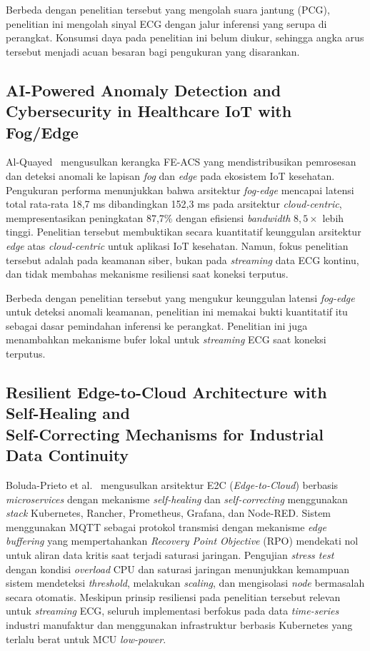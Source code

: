 Berbeda dengan penelitian tersebut yang mengolah suara jantung (PCG), penelitian ini mengolah sinyal ECG dengan jalur inferensi yang serupa di perangkat. Konsumsi daya pada penelitian ini belum diukur, sehingga angka arus tersebut menjadi acuan besaran bagi pengukuran yang disarankan.

\subsection{AI-Powered Anomaly Detection and Cybersecurity in Healthcare IoT with Fog/Edge}

Al-Quayed~\cite{al_quayed_2026} mengusulkan kerangka FE-ACS yang mendistribusikan pemrosesan dan deteksi anomali ke lapisan \textit{fog} dan \textit{edge} pada ekosistem IoT kesehatan. Pengukuran performa menunjukkan bahwa arsitektur \textit{fog-edge} mencapai latensi total rata-rata 18,7 ms dibandingkan 152,3 ms pada arsitektur \textit{cloud-centric}, mempresentasikan peningkatan 87,7\% dengan efisiensi \textit{bandwidth} $8{,}5\times$ lebih tinggi. Penelitian tersebut membuktikan secara kuantitatif keunggulan arsitektur \textit{edge} atas \textit{cloud-centric} untuk aplikasi IoT kesehatan. Namun, fokus penelitian tersebut adalah pada keamanan siber, bukan pada \textit{streaming} data ECG kontinu, dan tidak membahas mekanisme resiliensi saat koneksi terputus.

Berbeda dengan penelitian tersebut yang mengukur keunggulan latensi \textit{fog-edge} untuk deteksi anomali keamanan, penelitian ini memakai bukti kuantitatif itu sebagai dasar pemindahan inferensi ke perangkat. Penelitian ini juga menambahkan mekanisme bufer lokal untuk \textit{streaming} ECG saat koneksi terputus.

\subsection[Resilient Edge-to-Cloud Architecture with Self-Healing and Self-Correcting Mechanisms for Industrial Data Continuity]{Resilient Edge-to-Cloud Architecture with Self-Healing and\\ Self-Correcting Mechanisms for Industrial Data Continuity}

Boluda-Prieto et al.~\cite{resilient_edge_cloud} mengusulkan arsitektur E2C (\textit{Edge-to-Cloud}) berbasis \textit{microservices} dengan mekanisme \textit{self-healing} dan \textit{self-correcting} menggunakan \textit{stack} Kubernetes, Rancher, Prometheus, Grafana, dan Node-RED. Sistem menggunakan MQTT sebagai protokol transmisi dengan mekanisme \textit{edge buffering} yang mempertahankan \textit{Recovery Point Objective} (RPO) mendekati nol untuk aliran data kritis saat terjadi saturasi jaringan. Pengujian \textit{stress test} dengan kondisi \textit{overload} CPU dan saturasi jaringan menunjukkan kemampuan sistem mendeteksi \textit{threshold}, melakukan \textit{scaling}, dan mengisolasi \textit{node} bermasalah secara otomatis. Meskipun prinsip resiliensi pada penelitian tersebut relevan untuk \textit{streaming} ECG, seluruh implementasi berfokus pada data \textit{time-series} industri manufaktur dan menggunakan infrastruktur berbasis Kubernetes yang terlalu berat untuk MCU \textit{low-power}.

